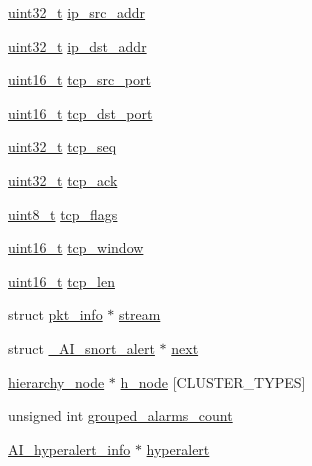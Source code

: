 \begin{DoxyCompactItemize}
\item 
\hyperlink{spp__ai_8h_a435d1572bf3f880d55459d9805097f62}{uint32\_\-t} \hyperlink{struct__AI__snort__alert_a194117c57a52933d16a97838562bb611}{ip\_\-src\_\-addr}
\item 
\hyperlink{spp__ai_8h_a435d1572bf3f880d55459d9805097f62}{uint32\_\-t} \hyperlink{struct__AI__snort__alert_a754ca683593c838e4032fa8c13b1512b}{ip\_\-dst\_\-addr}
\item 
\hyperlink{spp__ai_8h_a273cf69d639a59973b6019625df33e30}{uint16\_\-t} \hyperlink{struct__AI__snort__alert_a4d4cbdbd9675f4c43545547f55174cb7}{tcp\_\-src\_\-port}
\item 
\hyperlink{spp__ai_8h_a273cf69d639a59973b6019625df33e30}{uint16\_\-t} \hyperlink{struct__AI__snort__alert_aaca31cb67d48ffc3bfd1227686d5f5a4}{tcp\_\-dst\_\-port}
\item 
\hyperlink{spp__ai_8h_a435d1572bf3f880d55459d9805097f62}{uint32\_\-t} \hyperlink{struct__AI__snort__alert_ad6edf59fccea55bf5f940bf36117020b}{tcp\_\-seq}
\item 
\hyperlink{spp__ai_8h_a435d1572bf3f880d55459d9805097f62}{uint32\_\-t} \hyperlink{struct__AI__snort__alert_a8aac577224a4325ec50511c6d79b4b79}{tcp\_\-ack}
\item 
\hyperlink{spp__ai_8h_aba7bc1797add20fe3efdf37ced1182c5}{uint8\_\-t} \hyperlink{struct__AI__snort__alert_aa643f11db93b70242b57f0a04775e507}{tcp\_\-flags}
\item 
\hyperlink{spp__ai_8h_a273cf69d639a59973b6019625df33e30}{uint16\_\-t} \hyperlink{struct__AI__snort__alert_a1687fccc26bb211591db8b36ffec5348}{tcp\_\-window}
\item 
\hyperlink{spp__ai_8h_a273cf69d639a59973b6019625df33e30}{uint16\_\-t} \hyperlink{struct__AI__snort__alert_ab7e0507050b8e475fea7a4b26c768857}{tcp\_\-len}
\item 
struct \hyperlink{structpkt__info}{pkt\_\-info} $\ast$ \hyperlink{struct__AI__snort__alert_a09dfe0a841fd3912ec78060d4547cb31}{stream}
\item 
struct \hyperlink{struct__AI__snort__alert}{\_\-AI\_\-snort\_\-alert} $\ast$ \hyperlink{struct__AI__snort__alert_aa8336d4b3359015ed8ea312ca1fd1173}{next}
\item 
\hyperlink{struct__hierarchy__node}{hierarchy\_\-node} $\ast$ \hyperlink{struct__AI__snort__alert_ac53765584296ead1328eabfaba8a3aed}{h\_\-node} \mbox{[}CLUSTER\_\-TYPES\mbox{]}
\item 
unsigned int \hyperlink{struct__AI__snort__alert_a285aff12d6bac03c316ccc5305d28e53}{grouped\_\-alarms\_\-count}
\item 
\hyperlink{structAI__hyperalert__info}{AI\_\-hyperalert\_\-info} $\ast$ \hyperlink{struct__AI__snort__alert_ac101de15b4f9451f235b82122f77b62a}{hyperalert}
\end{DoxyCompactItemize}



